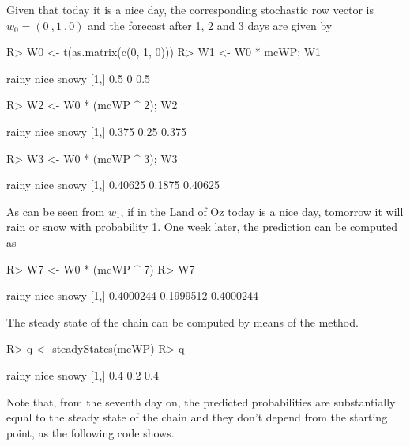\documentclass[nojss]{jss}
\begin{document}
Given that today it is a nice day, the corresponding stochastic row vector is
$w_{0}=(0\:,1\:,0)$ and the forecast after 1, 2 and 3 days are given by

\begin{Schunk}
\begin{Sinput}
R> W0 <- t(as.matrix(c(0, 1, 0)))
R> W1 <- W0 * mcWP; W1
\end{Sinput}
\begin{Soutput}
     rainy nice snowy
[1,]   0.5    0   0.5
\end{Soutput}
\begin{Sinput}
R> W2 <- W0 * (mcWP ^ 2); W2
\end{Sinput}
\begin{Soutput}
     rainy nice snowy
[1,] 0.375 0.25 0.375
\end{Soutput}
\begin{Sinput}
R> W3 <- W0 * (mcWP ^ 3); W3
\end{Sinput}
\begin{Soutput}
       rainy   nice   snowy
[1,] 0.40625 0.1875 0.40625
\end{Soutput}
\end{Schunk}

As can be seen from $w_{1}$, if in the Land of Oz today is a nice day, tomorrow it will rain or snow with probability 1. One week later, the prediction can be computed as

\begin{Schunk}
\begin{Sinput}
R> W7 <- W0 * (mcWP ^ 7)
R> W7
\end{Sinput}
\begin{Soutput}
         rainy      nice     snowy
[1,] 0.4000244 0.1999512 0.4000244
\end{Soutput}
\end{Schunk}

The steady state of the chain can be computed by means of the  method.

\begin{Schunk}
\begin{Sinput}
R> q <- steadyStates(mcWP)
R> q
\end{Sinput}
\begin{Soutput}
     rainy nice snowy
[1,]   0.4  0.2   0.4
\end{Soutput}
\end{Schunk}

Note that, from the seventh day on, the predicted probabilities are substantially equal to the steady state of the chain and they don't depend from the starting point, as the following code shows.
\end{document}
